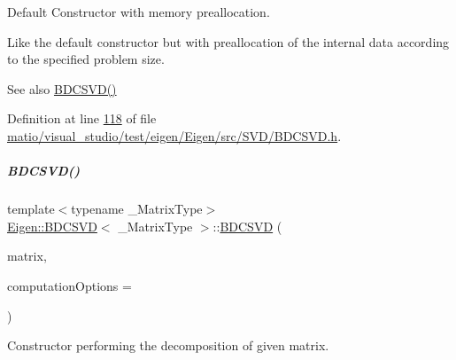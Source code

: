 Default Constructor with memory preallocation. 

Like the default constructor but with preallocation of the internal data according to the specified problem size. \begin{DoxySeeAlso}{See also}
\hyperlink{group___s_v_d___module_a39514816d38f9c418cf3f3514b511c2c}{B\+D\+C\+S\+V\+D()} 
\end{DoxySeeAlso}


Definition at line \hyperlink{matio_2visual__studio_2test_2eigen_2_eigen_2src_2_s_v_d_2_b_d_c_s_v_d_8h_source_l00118}{118} of file \hyperlink{matio_2visual__studio_2test_2eigen_2_eigen_2src_2_s_v_d_2_b_d_c_s_v_d_8h_source}{matio/visual\+\_\+studio/test/eigen/\+Eigen/src/\+S\+V\+D/\+B\+D\+C\+S\+V\+D.\+h}.

\mbox{\label{group___s_v_d___module_a302746d9c534cd513c1df87c7ae4850d}} 
\subparagraph{\texorpdfstring{B\+D\+C\+S\+V\+D()}{BDCSVD()}\hspace{0.1cm}{\footnotesize\ttfamily [6/6]}}
{\footnotesize\ttfamily template$<$typename \+\_\+\+Matrix\+Type$>$ \\
\hyperlink{group___s_v_d___module_class_eigen_1_1_b_d_c_s_v_d}{Eigen\+::\+B\+D\+C\+S\+VD}$<$ \+\_\+\+Matrix\+Type $>$\+::\hyperlink{group___s_v_d___module_class_eigen_1_1_b_d_c_s_v_d}{B\+D\+C\+S\+VD} (\begin{DoxyParamCaption}\item[{const Matrix\+Type \&}]{matrix,  }\item[{unsigned int}]{computation\+Options = {} }\end{DoxyParamCaption})\hspace{0.3cm}{\ttfamily [inline]}}



Constructor performing the decomposition of given matrix. 


